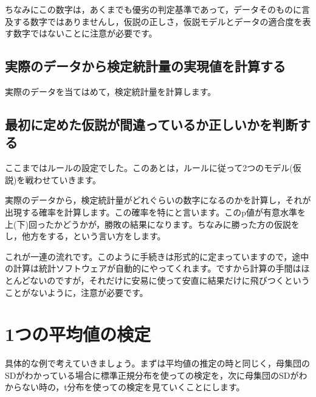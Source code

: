 \documentclass{ltjsbook}
\begin{document}
ちなみにこの数字は，あくまでも優劣の判定基準であって，データそのものに言及する数字ではありませんし，仮説の正しさ，仮説モデルとデータの適合度を表す数字ではないことに注意が必要です。

\subsection{実際のデータから検定統計量の実現値を計算する}

実際のデータを当てはめて，検定統計量を計算します。
\subsection{最初に定めた仮説が間違っているか正しいかを判断する}
ここまではルールの設定でした。このあとは，ルールに従って2つのモデル(仮説)を戦わせていきます。

実際のデータから，検定統計量がどれぐらいの数字になるのかを計算し，それが出現する確率を計算します。この確率を特にと言います。このp値が有意水準を上(下)回ったかどうかが，勝敗の結果になります。ちなみに勝った方の仮説をし，他方をする，という言い方をします。

これが一連の流れです。このように手続きは形式的に定まっていますので，途中の計算は統計ソフトウェアが自動的にやってくれます。ですから計算の手間はほとんどないのですが，それだけに安易に使って安直に結果だけに飛びつくということがないように，注意が必要です。



\section{1つの平均値の検定}
具体的な例で考えていきましょう。まずは平均値の推定の時と同じく，母集団のSDがわかっている場合に標準正規分布を使っての検定を，次に母集団のSDがわからない時の，t分布を使っての検定を見ていくことにします。
\end{document}

